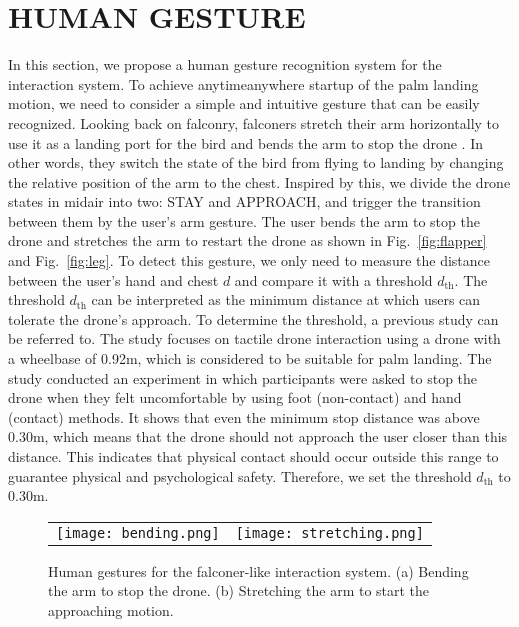 \section{HUMAN GESTURE}
\label{sec:gesture}

In this section, we propose a human gesture recognition system for the interaction system.
To achieve anytime{\-}anywhere startup of the palm landing motion, we need to consider a simple and intuitive gesture that can be easily recognized.
Looking back on falconry, falconers stretch their arm horizontally to use it as a landing port for the bird and bends the arm to stop the drone .
In other words, they switch the state of the bird from flying to landing by changing the relative position of the arm to the chest.
Inspired by this, we divide the drone states in midair into two: STAY and APPROACH,
and trigger the transition between them by the user's arm gesture.
The user bends the arm to stop the drone and stretches the arm to restart the drone as shown in Fig.~\ref{fig:flapper} and Fig.~\ref{fig:leg}.
To detect this gesture, we only need to measure the distance between the user's hand and chest $d$ and compare it with a threshold $d_{\text{th}}$.
The threshold $d_{\text{th}}$ can be interpreted as the minimum distance at which users can tolerate the drone's approach.
To determine the threshold, a previous study \cite{lieser2021evaluating-distances} can be referred to.
The study focuses on tactile drone interaction using a drone with a wheelbase of 0.92m, which is considered to be suitable for palm landing.
The study conducted an experiment in which participants were asked to stop the drone when they felt uncomfortable by using foot (non-contact) and hand (contact) methods.
It shows that even the minimum stop distance was above 0.30m, 
which means that the drone should not approach the user closer than this distance.
This indicates that physical contact should occur outside this range to guarantee physical and psychological safety.
Therefore, we set the threshold $d_{\text{th}}$ to 0.30m.

\begin{figure}
    \centering
    \begin{tabular}{cc}
        \begin{minipage}[t]{0.34 \columnwidth}
          \centering
          \texttt{[image: bending.png]}
          \subcaption{}
          \label{fig:flapper}
        \end{minipage} &
        \begin{minipage}[t]{0.48 \columnwidth}
          \centering
          \texttt{[image: stretching.png]}
          \subcaption{}
          \label{fig:leg}
        \end{minipage}
      \end{tabular}
    \caption{Human gestures for the falconer-like interaction system. (a) Bending the arm to stop the drone. (b) Stretching the arm to start the approaching motion.}
    \label{fig:gesture}
  \end{figure}
